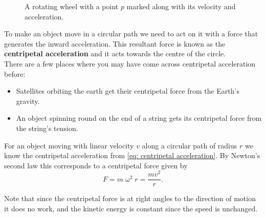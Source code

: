 \begin{figure}[ht]
    \centering
    \caption{A rotating wheel with a point $p$ marked along with its velocity and acceleration.}
        \label{fig: pt on a wheel 2}
\end{figure}


To make an object move in a circular path we need to act on it with a force that generates the inward acceleration. This resultant force is known as the \textbf{centripetal acceleration} and it acts towards the centre of the circle.\\

There are a few places where you may have come across centripetal acceleration before:
\begin{itemize}
\setlength{\itemsep}{-5pt}
    \item Satellites orbiting the earth get their centripetal force from the Earth's gravity.
    \item An object spinning round on the end of a string gets its centripetal force from the string's tension.
\end{itemize} 

For an object moving with linear velocity $v$ along a circular path of radius $r$ we know the centripetal acceleration from \cref{eq: centripetal acceleration}. By Newton's second law this corresponds to a centripetal force given by
\begin{equation}
F=m\upomega^{2}r=\frac{mv^{2}}{r}.
\label{eq: centripetal force}
\end{equation}

Note that since the centripetal force is at right angles to the direction of motion it does no work, and the kinetic energy is constant since the speed is unchanged.

